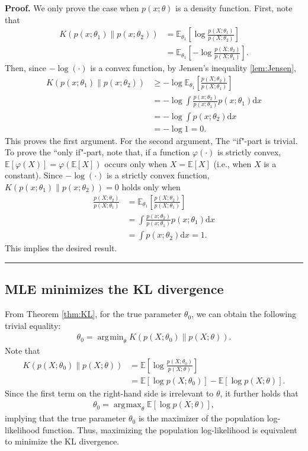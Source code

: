 \documentclass[10.5pt, A4paper, openany, uplatex]{book}
\newcommand{\mrm}{\mathrm}
\newcommand{\E}{\mathbb{E}}
\newenvironment{proof}[1][Proof]{\textbf{#1.} }{\  \rule{0.5em}{0.5em}}
\numberwithin{equation}{section}
\DeclareMathOperator*{\argmin}{\arg\!\min}
\DeclareMathOperator*{\argmax}{\arg\!\max}
\begin{document}
\begin{proof}
	We only prove the case when $p(x; \theta)$ is a density function.
	First, note that
	\begin{align*}
		K(p(x; \theta_1) \| p(x; \theta_2))  
		& = \E_{\theta_1}\left[\log \frac{p(X; \theta_1)}{p(X; \theta_2)} \right] \\
		& = \E_{\theta_1}\left[- \log \frac{p(X; \theta_2)}{p(X; \theta_1)} \right].
	\end{align*}
	Then, since $-\log(\cdot)$ is a convex function, by Jensen's inequality \ref{lem:Jensen},
	\begin{align*}
	K(p(x; \theta_1) \| p(x; \theta_2))  
	& \geq -\log \E_{\theta_1}\left[ \frac{p(X; \theta_2)}{p(X; \theta_1)} \right]\\
	& = - \log \int \frac{p(x; \theta_2)}{p(x; \theta_1)}  p(x; \theta_1) \mrm{d}x\\
	& = - \log \int p(x; \theta_2) \mrm{d}x \\
	& = - \log 1 = 0.
	\end{align*}
	This proves the first argument.
	For the second argument, The ``if"-part is trivial.
	To prove the ``only if"-part, note that, if a function $\varphi(\cdot)$ is strictly convex, $\E[\varphi(X)] = \varphi(\E[X])$ occurs only when $X = \E[X]$ (i.e., when $X$ is a constant).
	 Since $- \log(\cdot)$ is a strictly convex function, $K(p(x; \theta_1) \| p(x; \theta_2)) = 0$ holds only when
	 \begin{align*}
	 	\frac{p(X; \theta_2)}{p(X; \theta_1)} 
	 	& =  \E_{\theta_1}\left[ \frac{p(X; \theta_2)}{p(X; \theta_1)} \right]\\
	 	& = \int \frac{p(x; \theta_2)}{p(x; \theta_1)}  p(x; \theta_1) \mrm{d}x\\
	 	& = \int p(x; \theta_2) \mrm{d}x = 1.
	 \end{align*}
	 This implies the desired result.
\end{proof}

\subsection{MLE minimizes the KL divergence}\label{subsec:MLEconsistency}

From Theorem \ref{thm:KL}, for the true parameter $\theta_0$, we can obtain the following trivial equality:
\begin{align*}
	\theta_0 = \argmin_\theta K( p(X; \theta_0) \| p(X; \theta) ).
\end{align*}
 Note that
\begin{align*}
	K( p(X; \theta_0) \| p(X; \theta) )
	&= \E\left[\log \frac{p(X; \theta_0)}{p(X; \theta)} \right]\\
	&= \E[\log p(X; \theta_0)] - \E[\log p(X; \theta) ].
\end{align*}
Since the first term on the right-hand side is irrelevant to $\theta$, it further holds that
\begin{align}\label{eq:pop-mle}
	\theta_0 = \argmax_\theta \E[\log p(X; \theta) ],
\end{align}
implying that the true parameter $\theta_0$ is the maximizer of the population log-likelihood function.
Thus, maximizing the population log-likelihood is equivalent to minimize the KL divergence.
\end{document}
